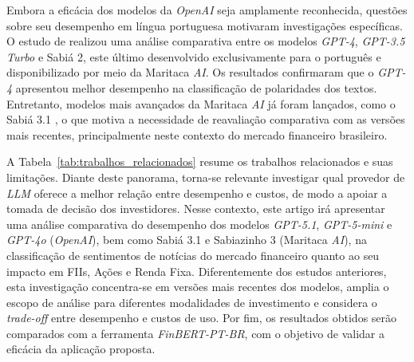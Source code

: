 \documentclass[12pt]{article}
\begin{document}
Embora a eficácia dos modelos da \textit{OpenAI} seja amplamente reconhecida, questões sobre seu desempenho em língua portuguesa motivaram investigações específicas. O estudo de \cite{de2024explorando} realizou uma análise comparativa entre os modelos \textit{GPT-4}, \textit{GPT-3.5 Turbo} e Sabiá 2, este último desenvolvido exclusivamente para o português e disponibilizado por meio da Maritaca \textit{AI}. Os resultados confirmaram que o \textit{GPT-4} apresentou melhor desempenho na classificação de polaridades dos textos. Entretanto, modelos mais avançados da Maritaca \textit{AI} já foram lançados, como o Sabiá 3.1 \cite{maritaca_modelos}, o que motiva a necessidade de reavaliação comparativa com as versões mais recentes, principalmente neste contexto do mercado financeiro brasileiro.

A Tabela~\ref{tab:trabalhos_relacionados} resume os trabalhos relacionados e suas limitações. Diante deste panorama, torna-se relevante investigar qual provedor de \textit{LLM} oferece a melhor relação entre desempenho e custos, de modo a apoiar a tomada de decisão dos investidores. Nesse contexto, este artigo irá apresentar uma análise comparativa do desempenho dos modelos \textit{GPT-5.1}, \textit{GPT-5-mini} e \textit{GPT-4o} (\textit{OpenAI}), bem como Sabiá 3.1 e Sabiazinho 3 (Maritaca \textit{AI}), na classificação de sentimentos de notícias do mercado financeiro quanto ao seu impacto em FIIs, Ações e Renda Fixa. Diferentemente dos estudos anteriores, esta investigação concentra-se em versões mais recentes dos modelos, amplia o escopo de análise para diferentes modalidades de investimento e considera o \textit{trade-off} entre desempenho e custos de uso. Por fim, os resultados obtidos serão comparados com a ferramenta \textit{FinBERT-PT-BR}, com o objetivo de validar a eficácia da aplicação proposta.

\end{document}
